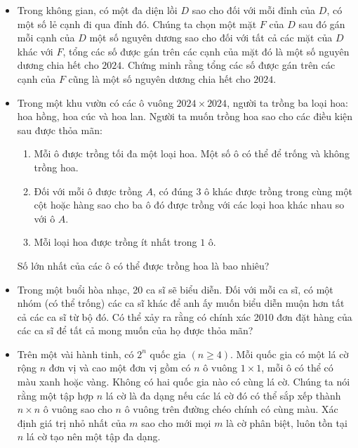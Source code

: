 \documentclass[11pt]{scrartcl}
\begin{document}
\begin{itemize}[label=, leftmargin=0em, itemsep=-0em]
    \item \begin{btvn}
        Trong không gian, có một đa diện lồi $D$ sao cho đối với mỗi đỉnh của $D$, có một số lẻ cạnh đi qua đỉnh đó. Chúng ta chọn một mặt $F$ của $D$ sau đó gán mỗi cạnh của $D$ một số nguyên dương sao cho đối với tất cả các mặt của $D$ khác với $F$, tổng các số được gán trên các cạnh của mặt đó là một số nguyên dương chia hết cho $2024$. Chứng minh rằng tổng các số được gán trên các cạnh của $F$ cũng là một số nguyên dương chia hết cho $2024$.
    \end{btvn}

    \item \begin{btvn} Trong một khu vườn có các ô vuông $2024\times 2024$, người ta trồng ba loại hoa: hoa hồng, hoa cúc và hoa lan. Người ta muốn trồng hoa sao cho các điều kiện sau được thỏa mãn:
        \begin{enumerate}
            \item Mỗi ô được trồng tối đa một loại hoa. Một số ô có thể để trống và không trồng hoa.
            \item Đối với mỗi ô được trồng $A$, có đúng $3$ ô khác được trồng trong cùng một cột hoặc hàng sao cho ba ô đó được trồng với các loại hoa khác nhau so với ô $A$.
            \item Mỗi loại hoa được trồng ít nhất trong $1$ ô.
        \end{enumerate}
        Số lớn nhất của các ô có thể được trồng hoa là bao nhiêu?
    \end{btvn}
    \item \begin{btvn}
        Trong một buổi hòa nhạc, 20 ca sĩ sẽ biểu diễn. Đối với mỗi ca sĩ, có một nhóm (có thể trống) các ca sĩ khác để anh ấy muốn biểu diễn muộn hơn tất cả các ca sĩ từ bộ đó. Có thể xảy ra rằng có chính xác 2010 đơn đặt hàng của các ca sĩ để tất cả mong muốn của họ được thỏa mãn?
    \end{btvn}
    \item \begin{btvn}
        Trên một vài hành tinh, có $2^n$ quốc gia $(n \geq 4)$. Mỗi quốc gia có một lá cờ rộng $n$ đơn vị và cao một đơn vị gồm có $n$ ô vuông $1\times 1$, mỗi ô có thể có màu xanh hoặc vàng. Không có hai quốc gia nào có cùng lá cờ. Chúng ta nói rằng một tập hợp $n$ lá cờ là đa dạng nếu các lá cờ đó có thể sắp xếp thành $n \times n$ ô vuông sao cho $n$ ô vuông trên đường chéo chính có cùng màu. Xác định giá trị nhỏ nhất của $m$ sao cho mới mọi $m$ là cờ phân biệt, luôn tồn tại $n$ lá cờ tạo nên một tập đa dạng.

\end{btvn}
\end{itemize}
\end{document}
